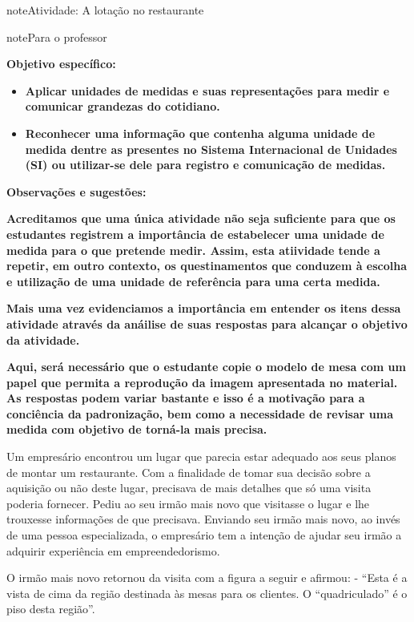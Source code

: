 \begin{sphinxadmonition}{note}{Atividade: A lotação no restaurante}

\begin{sphinxadmonition}{note}{Para o professor}

\textbf{Objetivo específico:}
\begin{itemize}
\item {} 
\textbf{Aplicar unidades de medidas e suas representações para medir e comunicar grandezas do cotidiano.}

\item {} 
\textbf{Reconhecer uma informação que contenha alguma unidade de medida dentre as presentes no Sistema Internacional de Unidades (SI) ou utilizar-se dele para registro e comunicação de medidas.}

\end{itemize}

\textbf{Observações e sugestões:}

\textbf{Acreditamos que uma única atividade não seja suficiente para que os estudantes registrem a importância de estabelecer uma unidade de medida para o que pretende medir. Assim, esta atiividade tende a repetir, em outro contexto, os questinamentos que conduzem à escolha e utilização de uma unidade de referência para uma certa medida.}

\textbf{Mais uma vez evidenciamos a importância em entender os itens dessa atividade através da anáilise de suas respostas para alcançar o objetivo da atividade.}

\textbf{Aqui, será necessário que o estudante copie o modelo de mesa com um papel que permita a reprodução da imagem apresentada no material. As respostas podem variar bastante e isso é a motivação para a conciência da padronização, bem como a necessidade de revisar uma medida com objetivo de torná-la mais precisa.}
\end{sphinxadmonition}

Um empresário encontrou um lugar que parecia estar adequado aos seus planos de montar um restaurante. Com a finalidade de tomar sua decisão sobre a aquisição ou não deste lugar, precisava de mais detalhes que só uma visita poderia fornecer. Pediu ao seu irmão mais novo que visitasse o lugar e lhe trouxesse informações de que precisava. Enviando seu irmão mais novo, ao invés de uma pessoa especializada, o empresário tem a intenção de ajudar seu irmão a adquirir experiência em empreendedorismo.

O irmão mais novo retornou da visita com a figura a seguir e afirmou:  - “Esta é a vista de cima da região destinada às mesas para os clientes. O  “quadriculado”  é o piso desta região”.


\end{sphinxadmonition}
